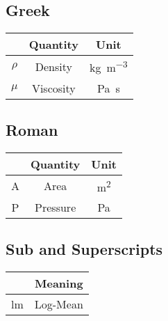 \subsection*{Greek}\label{sec:symbols_greek}
    \begin{table}[ht]
        \centering
        \begin{tabular}{c|c|c}
            & Quantity & Unit \\
            \hline
            $\rho$ & Density & \unit{\kilo\gram\per\cubic\metre} \\
            $\mu$ & Viscosity & \unit{\pascal\second}
        \end{tabular}
    \end{table}
    

\subsection*{Roman}\label{sec:symbols_roman}
    \begin{table}[ht]
        \centering
        \begin{tabular}{c|c|c}
            & Quantity & Unit \\
            \hline
            A & Area & \unit{\square\metre} \\
            P & Pressure & \unit{\pascal}
        \end{tabular}
    \end{table}


\subsection*{Sub\- and Superscripts}\label{sec:symbols_scripts}
    \begin{table}[ht]
        \centering
        \begin{tabular}{c|c}
             & Meaning \\
            \hline
            lm & Log-Mean
        \end{tabular}
    \end{table}
